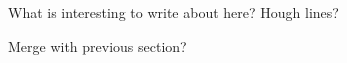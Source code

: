 What is interesting to write about here? Hough lines?

Merge with previous section?





















